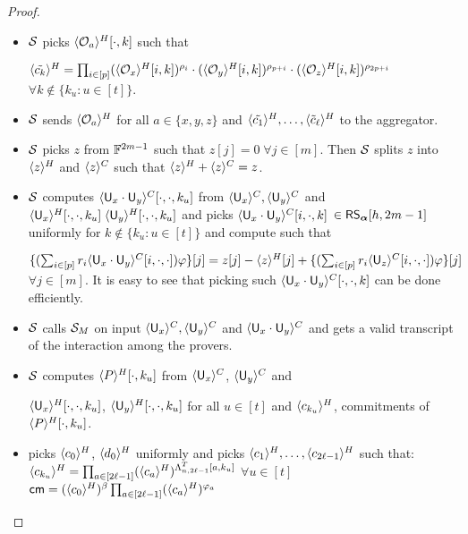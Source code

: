 \begin{proof}
\begin{itemize}
		\item $\mathcal{S}$ picks $\langle{\mathcal{O}_a}\rangle^H[\cdot, k]$ such that 
		
		$\langle{\tilde{c_k}}\rangle^H = \prod_{i\in[p]} (\langle{\mathcal{O}_x}\rangle^H[i,k])^{\rho_i}\cdot(\langle{\mathcal{O}_y}\rangle^H[i,k])^{\rho_{p+i}}\cdot(\langle{\mathcal{O}_z}\rangle^H[i,k])^{\rho_{2p+i}}$ $\forall k\notin\{k_u:u\in[t]\}$.
		
		\item $\mathcal{S}$ sends $\langle{\mathcal{O}_a}\rangle^H$ for all $a\in\{x,y,z\}$ and $\langle{\tilde{c_1}}\rangle^H, \ldots, \langle{\tilde{c}_{\ell}}\rangle^H$ to the aggregator.
		
		\item $\mathcal{S}$ picks $z$ from $\mathbb{F}^{2m-1}$ such that $z[j]=0\; \forall j\in[m]$. Then $\mathcal{S}$ splits $z$ into $\langle{z}\rangle^H$ and $\langle{z}\rangle^C$ such that $\langle{z}\rangle^H+\langle{z}\rangle^C = z$.
		
		\item $\mathcal{S}$ computes $\langle{\mathsf{U}_x\cdot\mathsf{U}_y}\rangle^C[\cdot,\cdot,k_u]$ from $\langle{\mathsf{U}_x}\rangle^C, \langle{\mathsf{U}_y}\rangle^C$ and $\langle{\mathsf{U}_x}\rangle^H[\cdot,\cdot,k_u]\; \langle{\mathsf{U}_y}\rangle^H[\cdot,\cdot,k_u]$ and picks $\langle{\mathsf{U}_x\cdot\mathsf{U}_y}\rangle^C[i,\cdot,k]$ $\in \mathsf{RS}_{\bm{\alpha}}[h,2m-1]$ uniformly for $k\notin \{k_u:u\in[t]\}$ and compute such that 
		
		$\{(\sum_{i\in[p]}r_i\langle{\mathsf{U}_x\cdot\mathsf{U}_y}\rangle^C[i,\cdot,\cdot])\varphi\}[j]=z[j] -\langle{z}\rangle^H[j]+\{(\sum_{i\in[p]}r_i\langle{\mathsf{U}_z}\rangle^C[i,\cdot,\cdot])\varphi\}[j]$ $\forall j\in[m]$.
		It is easy to see that picking such $\langle{\mathsf{U}_x\cdot\mathsf{U}_y}\rangle^C[\cdot,\cdot,k]$ can be done efficiently.
		
		\item $\mathcal{S}$ calls $\mathcal{S}_{M}$ on input $\langle{\mathsf{U}_x}\rangle^C, \langle{\mathsf{U}_y}\rangle^C$ and $\langle{\mathsf{U}_x\cdot\mathsf{U}_y}\rangle^C$ and gets a valid transcript of the interaction among the provers.
		
		\item $\mathcal{S}$ computes $\langle{P}\rangle^H[\cdot,k_u]$ from $\langle{\mathsf{U}_x}\rangle^C$, $\langle{\mathsf{U}_y}\rangle^C$ and 
		
		\noindent$\langle{\mathsf{U}_x}\rangle^H[\cdot,\cdot,k_u]$, $\langle{\mathsf{U}_y}\rangle^H[\cdot,\cdot,k_u]$ for all $u\in[t]$ and $\langle{c_{k_u}}\rangle^H$, commitments of $\langle{P}\rangle^H[\cdot,k_u]$.
		
		\item picks $\langle{c_0}\rangle^H$, $\langle{d_0}\rangle^H$ uniformly and picks
		$\langle{c_1}\rangle^H, \ldots, \langle{c_{2\ell-1}}\rangle^H$ such that:\\
		$\langle{c_{k_u}}\rangle^H = \prod_{a\in[2\ell-1]}(\langle{c_a}\rangle^H)^{\Lambda_{n,2\ell-1}^T[a,k_u]}$ $\forall u\in[t]$\\
		$\mathsf{cm} = (\langle{c_0}\rangle^H)^{\beta}\prod_{a\in[2\ell-1]}(\langle{c_a}\rangle^H)^{\varphi_a}$
		

\end{itemize}
\end{proof}
